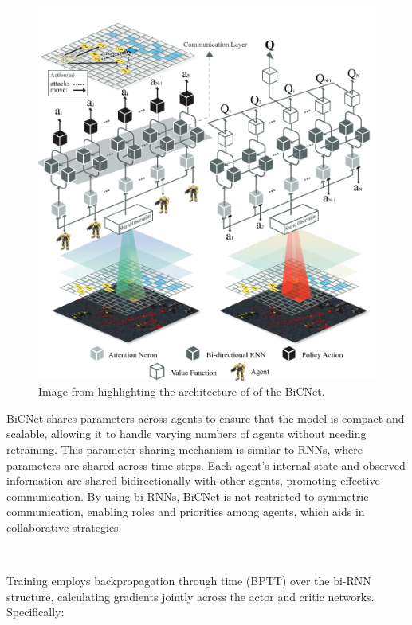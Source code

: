 \documentclass{article}
\begin{document}
\begin{figure}
	\centering
	\includegraphics[scale=0.5]{images/bicnet}
	\caption{Image from \citet{peng2017bicnet} highlighting the architecture of of the BiCNet.}
	\label{fig:ic3net.png}
\end{figure}

BiCNet shares parameters across agents to ensure that the model is compact and scalable, allowing it to handle varying numbers of agents without needing retraining. This parameter-sharing mechanism is similar to RNNs, where parameters are shared across time steps. Each agent’s internal state and observed information are shared bidirectionally with other agents, promoting effective communication. By using bi-RNNs, BiCNet is not restricted to symmetric communication, enabling roles and priorities among agents, which aids in collaborative strategies.

\

Training employs backpropagation through time (BPTT) over the bi-RNN structure, calculating gradients jointly across the actor and critic networks. Specifically:
\end{document}
